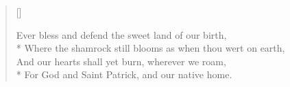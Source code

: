 \begin{verse}[\versewidth]

Ever bless and defend the sweet land of our birth,\\*
        Where the shamrock still blooms as when thou wert on earth,\\
        And our hearts shall yet burn, wherever we roam,\\*
        For God and Saint Patrick, and our native home.


\end{verse}



